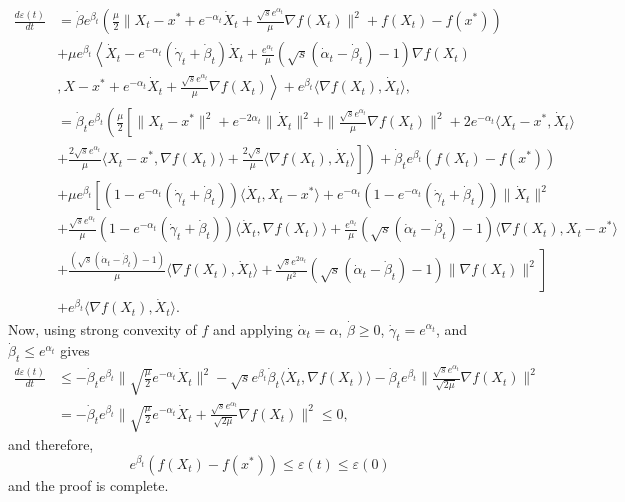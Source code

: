 \documentclass{article}
\theoremstyle{plain}
\theoremstyle{definition}
\theoremstyle{remark}
\begin{document}
    \begin{align}\label{thm32_eqn_3}
        \frac{d\varepsilon(t)}{dt}&=\dot \beta e^{\beta_t}\left(\frac{\mu}{2}\|X_t-x^*+e^{-\alpha_t}\dot X_t+\frac{\sqrt{s}e^{\alpha_t}}{\mu}\nabla f(X_t)\|^2+f(X_t)-f(x^*)\right)\nonumber\\
       & + \mu e^{\beta_t}\left\langle \dot X_t-e^{-\alpha_t}(\dot \gamma_t+\dot \beta_t)\dot X_t  +\frac{e^{\alpha_t }}{\mu}(\sqrt{s}(\dot \alpha_t-\dot \beta_t)-1)\nabla f(X_t)\right.\nonumber\\
       &\left. ,X-x^*+e^{-\alpha_t}\dot X_t+\frac{\sqrt{s}e^{\alpha_t}}{\mu}\nabla f(X_t)\right\rangle+e^{\beta_t}\langle \nabla f(X_t),\dot X_t \rangle,\nonumber\\
   &= \dot \beta_t e^{\beta_t}\left(\frac{\mu}{2}\left[\|X_t-x^*\|^2+e^{-2\alpha_t}\|\dot X_t\|^2+\|\frac{\sqrt{s}e^{\alpha_t}}{\mu}\nabla f(X_t)\|^2+2e^{-\alpha_t}\langle X_t-x^*,\dot X_t\rangle\right.\right.\nonumber\\
   &\left.\left.+\frac{2\sqrt{s}e^{\alpha_t}}{\mu}\langle X_t-x^*,\nabla f(X_t) \rangle+ \frac{2\sqrt{s}}{\mu}\langle \nabla f(X_t),\dot X_t \rangle\right]\right)+\dot \beta_t e^{\beta_t} (f(X_t)-f(x^*) )\nonumber\\
   & +\mu e^{\beta_t}\left[ (1-e^{-\alpha_t}(\dot \gamma_t+\dot \beta_t))\langle \dot X_t,X_t-x^*\rangle+ e^{-\alpha_t}(1-e^{-\alpha_t}(\dot \gamma_t+\dot \beta_t))\|\dot X_t\|^2 \right.\nonumber\\
   & +\frac{\sqrt{s}e^{\alpha_t}}{\mu}(1-e^{-\alpha_t}(\dot \gamma_t+\dot \beta_t))\langle \dot X_t,\nabla f(X_t) \rangle + \frac{e^{\alpha_t }}{\mu}(\sqrt{s}(\dot \alpha_t-\dot \beta_t)-1)\langle \nabla f(X_t) ,X_t-x^*\rangle\nonumber\\
   & \left.+ \frac{(\sqrt{s}(\dot \alpha_t-\dot \beta_t)-1)}{\mu}\langle \nabla f(X_t),\dot X_t \rangle+\frac{\sqrt{s}e^{2\alpha_t}}{\mu^2}(\sqrt{s}(\dot \alpha_t-\dot \beta_t)-1)\|\nabla f(X_t)\|^2\right]\nonumber\\
   & + e^{\beta_t}\langle \nabla f(X_t),\dot X_t \rangle.
    \end{align}
    Now, using strong convexity of $f$ and applying $\dot \alpha_t=\alpha$, $\dot \beta\geq 0$, $\dot \gamma_t=e^{\alpha_t}$, and $\dot \beta_t\leq e^{\alpha_t}$ gives
    \begin{align}\label{thm32_eqn_4}
        \frac{d\varepsilon(t)}{dt}&\leq-\dot \beta_t e^{\beta_t}\|\sqrt{\frac{\mu}{2}}e^{-\alpha_t}\dot X_t\|^2-\sqrt{s}e^{\beta_t}\dot \beta_t\langle \dot X_t,\nabla f(X_t) \rangle-\dot \beta_t e^{\beta_t}\|\frac{\sqrt{s}e^{\alpha_t}}{\sqrt{2\mu}}\nabla f(X_t)\|^2\nonumber\\
        &=-\dot \beta_t e^{\beta_t} \|    \sqrt{\frac{\mu}{2}}e^{-\alpha_t}\dot X_t+  \frac{\sqrt{s}e^{\alpha_t}}{\sqrt{2\mu}}\nabla f(X_t)\|^2\leq 0,
    \end{align}
    and therefore, 
    $$e^{\beta_t}(f(X_t)-f(x^*))\leq \varepsilon(t)\leq \varepsilon(0)$$
    and the proof is complete.
\end{document}
